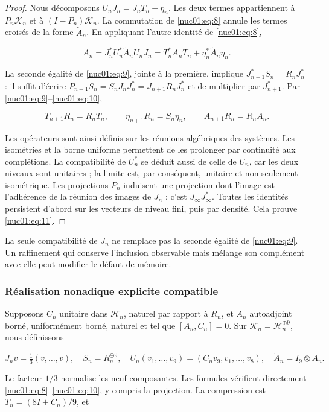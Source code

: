 \begin{proof}
Nous décomposons \(U_nJ_n=J_nT_n+\eta_n\). Les deux termes appartiennent à \(P_n\mathscr K_n\) et à \((I-P_n)\mathscr K_n\). La commutation de \eqref{nuc01:eq:8} annule les termes croisés de la forme \(\widetilde A_n\). En appliquant l’autre identité de \eqref{nuc01:eq:8},


\[
A_n=J_n^*U_n^*\widetilde A_nU_nJ_n
=T_n^*A_nT_n+\eta_n^*\widetilde A_n\eta_n.
\]

La seconde égalité de \eqref{nuc01:eq:9}, jointe à la première, implique
\(J_{n+1}^*S_n=R_nJ_n^*\) : il suffit d’écrire
\(P_{n+1}S_n=S_nJ_nJ_n^*=J_{n+1}R_nJ_n^*\) et de multiplier par \(J_{n+1}^*\).
Par \eqref{nuc01:eq:9}–\eqref{nuc01:eq:10},

\[
T_{n+1}R_n=R_nT_n,\qquad
\eta_{n+1}R_n=S_n\eta_n,\qquad
A_{n+1}R_n=R_nA_n.
\]

Les opérateurs sont ainsi définis sur les réunions algébriques des systèmes. Les isométries et la borne uniforme permettent de les prolonger par continuité aux complétions. La compatibilité de \(U_n^*\) se déduit aussi de celle de \(U_n\), car les deux niveaux sont unitaires ; la limite est, par conséquent, unitaire et non seulement isométrique. Les projections \(P_n\) induisent une projection dont l’image est l’adhérence de la réunion des images de \(J_n\) ; c’est \(J_\infty J_\infty^*\). Toutes les identités persistent d’abord sur les vecteurs de niveau fini, puis par densité. Cela prouve \eqref{nuc01:eq:11}.
\end{proof}

La seule compatibilité de \(J_n\) ne remplace pas la seconde égalité de \eqref{nuc01:eq:9}. Un raffinement qui conserve l’inclusion observable mais mélange son complément avec elle peut modifier le défaut de mémoire.

\subsubsection{Réalisation nonadique explicite compatible
}

Supposons \(C_n\) unitaire dans \(\mathscr H_n\), naturel par rapport à \(R_n\), et \(A_n\) autoadjoint borné, uniformément borné, naturel et tel que \([A_n,C_n]=0\). Sur \(\mathscr K_n=\mathscr H_n^{\oplus9}\), nous définissons


\[
J_nv=\tfrac13(v,\ldots,v),\quad
S_n=R_n^{\oplus9},\quad
U_n(v_1,\ldots,v_9)=(C_nv_9,v_1,\ldots,v_8),
\quad \widetilde A_n=I_9\otimes A_n.
\]

Le facteur \(1/3\) normalise les neuf composantes. Les formules vérifient directement \eqref{nuc01:eq:8}–\eqref{nuc01:eq:10}, y compris la projection. La compression est \(T_n=(8I+C_n)/9\), et

